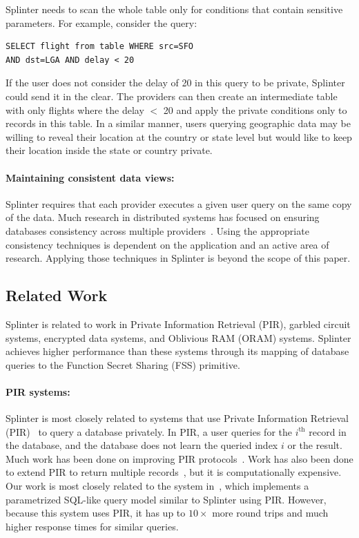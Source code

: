 Splinter needs to scan the whole table only for conditions 
that contain sensitive parameters.
For example, consider the query:
\begin{verbatim}
SELECT flight from table WHERE src=SFO 
AND dst=LGA AND delay < 20
\end{verbatim}
If the user does not consider the delay of 20 in this query to be
private, Splinter could send it in the clear.
The providers can then create an intermediate
table with only flights where the delay $<$ 20 and apply the private
conditions only to records in this table.
In a similar manner, users querying geographic data may be willing to
reveal their location at the country or state level but would like to
keep their location inside the state or country private.

\paragraph{Maintaining consistent data views:}
Splinter requires that each provider executes a given user
query on the same copy of the data. 
Much research in distributed systems has focused on ensuring
databases consistency across multiple providers~\cite{spanner, ongaro:raft, tu:silo}.
Using the appropriate consistency techniques is dependent
on the application and an active area of research.
Applying those techniques in Splinter is beyond the scope
of this paper.


\subsection{Related Work}
\label{spl-sec:related}
Splinter is related to work in Private Information Retrieval (PIR),
garbled circuit systems, encrypted data systems, 
and Oblivious RAM (ORAM) systems. Splinter achieves higher performance than these systems 
through its mapping of database queries to the Function Secret Sharing (FSS) primitive.

\paragraph{PIR systems:}
Splinter is most closely related to systems that use Private
Information Retrieval (PIR)~\cite{chor1998private} to query a database privately.
In PIR, a user queries for the $i^\mathrm{th}$ record in the database, and the database
does not learn the queried index $i$ or the result.
Much work has been done on improving 
PIR protocols~\cite{ostrovsky2007survey, olumofin2011revisiting}. 
Work has also been done to extend PIR to return multiple records~\cite{groth2010multi},
but it is computationally expensive.
Our work is most closely related to the system in~\cite{goldberg}, which implements
a parametrized SQL-like query model similar to Splinter using PIR. However,
because this system uses PIR, it has up to $10\times$ more round trips 
and much higher response times for similar queries. 

